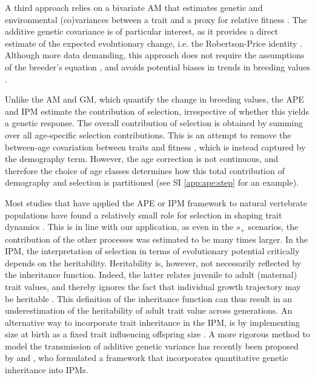 A third approach relies on a bivariate AM that estimates genetic and environmental (co)variances between a trait and a proxy for relative fitness \parencite{Lande1979,Lynch2014}. The additive genetic covariance is of particular interest, as it provides a direct estimate of the expected evolutionary change, i.e. the Robertson-Price identity \parencite{Robertson1966,Price1970,Lynch1998}. Although more data demanding, this approach does not require the assumptions of the breeder's equation \parencite{Morrissey2012}, and avoids potential biases in trends in breeding values \parencite{Postma2006}.

Unlike the AM and GM, which quantify the change in breeding values, the APE and IPM estimate the contribution of selection, irrespective of whether this yields a genetic response. The overall contribution of selection is obtained by summing over all age-specific selection contributions. This is an attempt to remove the between-age covariation between traits and fitness \parencite{engen2014b}, which is instead captured by the demography term. However, the age correction is not continuous, and therefore the choice of age classes determines how this total contribution of demography and selection is partitioned (see SI \ref{app:ape:step} for an example).

Most studies that have applied the APE or IPM framework to natural vertebrate populations have found a relatively small role for selection in shaping trait dynamics \parencite[e.g.][]{Ozgul2009,traill2014demography}. This is in line with our application, as even in the $s_+$ scenarios, the contribution of the other processes was estimated to be many times larger. In the IPM, the interpretation of selection in terms of evolutionary potential critically depends on the heritability. Heritability is, however, not necessarily reflected by the inheritance function. Indeed, the latter relates juvenile to adult (maternal) trait values, and thereby ignores the fact that individual growth trajectory may be heritable \parencite{chevin2015}. This definition of the inheritance function can thus result in an underestimation of the heritability of adult trait value across generations. An alternative way to incorporate trait inheritance in the IPM, is by implementing  size at birth as a fixed trait influencing offspring size \parencite{vindenes2015}. A more rigorous method to model the transmission of additive genetic variance has recently been proposed by \cite{Coulson2015} and \cite{Childs2016}, who formulated a framework that incorporates quantitative genetic inheritance into IPMs.

